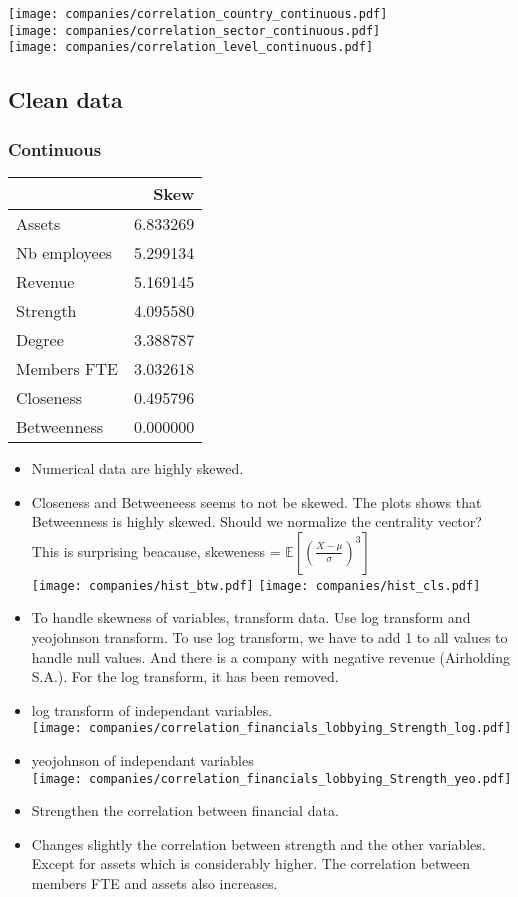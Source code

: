 \documentclass[ 11pt]{article}
\begin{document}
\texttt{[image: companies/correlation\_country\_continuous.pdf]}\\
\texttt{[image: companies/correlation\_sector\_continuous.pdf]}\\
\texttt{[image: companies/correlation\_level\_continuous.pdf]}
	
	\subsection{Clean data}
	\subsubsection{Continuous}

\begin{tabular}{lr}
\toprule
 & Skew \\
\midrule
Assets & 6.833269 \\
Nb employees & 5.299134 \\
Revenue & 5.169145 \\
Strength & 4.095580 \\
Degree & 3.388787 \\
Members FTE & 3.032618 \\
Closeness & 0.495796 \\
Betweenness & 0.000000 \\
\bottomrule
\end{tabular}
	\begin{itemize}
		\item Numerical data are highly skewed.
		\item Closeness and Betweeneess seems to not be skewed. The plots shows that Betweenness is highly skewed. Should we normalize the centrality vector? This is surprising beacause, skeweness = $ \mathbb{E}[ (\frac{X-\mu}{\sigma})^3]$ \\
		\texttt{[image: companies/hist\_btw.pdf]} \texttt{[image: companies/hist\_cls.pdf]}
		
	\item To handle skewness of variables, transform data. Use log transform and yeojohnson transform. To use log transform, we have to add 1 to all values to handle null values. And there is a company with negative revenue (Airholding S.A.). For the log transform, it has been removed. 
	\item log transform of independant variables. \\
	\texttt{[image: companies/correlation\_financials\_lobbying\_Strength\_log.pdf]}
	
	\item yeojohnson of independant variables\\
	\texttt{[image: companies/correlation\_financials\_lobbying\_Strength\_yeo.pdf]}
	\item  Strengthen the correlation between financial data.
	\item Changes slightly the correlation between strength and the other variables. Except for assets which is considerably higher. The correlation between members FTE and assets also increases.
	\end{itemize}
\end{document}
